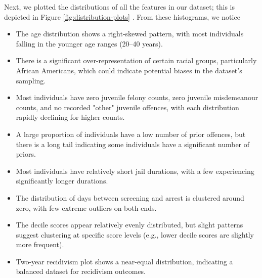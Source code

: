 \documentclass[conference]{IEEEtran}
\begin{document}
	Next, we plotted the distributions of all the features in our dataset; this is depicted in Figure \ref{fig:distribution-plots} . From these histograms, we notice 
	\begin{itemize}
		\item The age distribution shows a right-skewed pattern, with most individuals falling in the younger age ranges (20–40 years).
		
		\item There is a significant over-representation of certain racial groups, particularly African Americans, which could indicate potential biases in the dataset's sampling.
		
		\item Most individuals have zero juvenile felony counts, zero juvenile misdemeanour counts, and no recorded "other" juvenile offences, with each distribution rapidly declining for higher counts.
		
		\item A large proportion of individuals have a low number of prior offences, but there is a long tail indicating some individuals have a significant number of priors.
		
		\item Most individuals have relatively short jail durations, with a few experiencing significantly longer durations.
		
		\item The distribution of days between screening and arrest is clustered around zero, with few extreme outliers on both ends.
		
		\item The decile scores appear relatively evenly distributed, but slight patterns suggest clustering at specific score levels (e.g., lower decile scores are slightly more frequent).
		
		\item Two-year recidivism plot shows a near-equal distribution, indicating a balanced dataset for recidivism outcomes.
	\end{itemize}
\end{document}

